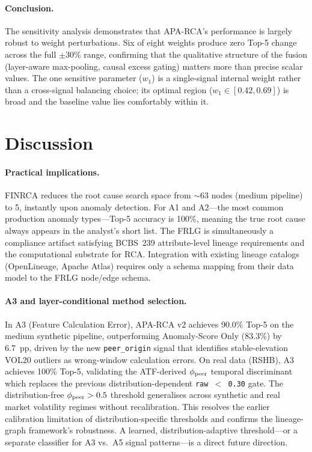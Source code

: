 \documentclass{article}
\newcommand{\finrca}{\textsc{FINRCA}}
\newcommand{\aparca}{\textsc{APA-RCA}}
\begin{document}
\paragraph{Conclusion.}
The sensitivity analysis demonstrates that \aparca{}'s performance is largely
robust to weight perturbations.
Six of eight weights produce zero Top-5 change across the full $\pm$30\% range,
confirming that the qualitative structure of the fusion (layer-aware max-pooling,
causal excess gating) matters more than precise scalar values.
The one sensitive parameter ($w_1$) is a single-signal internal weight
rather than a cross-signal balancing choice; its optimal region ($w_1 \in [0.42, 0.69]$)
is broad and the baseline value lies comfortably within it.

\section{Discussion}
\label{sec:discussion}

\paragraph{Practical implications.}
\finrca{} reduces the root cause search space from $\sim$63 nodes (medium
pipeline) to 5, instantly upon anomaly detection.
For A1 and A2---the most common production anomaly types---Top-5 accuracy is
100\%, meaning the true root cause always appears in the analyst's short list.
The FRLG is simultaneously a compliance artifact satisfying BCBS~239
attribute-level lineage requirements and the computational substrate for RCA.
Integration with existing lineage catalogs (OpenLineage, Apache Atlas) requires
only a schema mapping from their data model to the FRLG node/edge schema.

\paragraph{A3 and layer-conditional method selection.}
In A3 (Feature Calculation Error), \aparca{} v2 achieves 90.0\% Top-5 on the medium
synthetic pipeline, outperforming Anomaly-Score Only (83.3\%) by 6.7~pp,
driven by the new \texttt{peer\_origin} signal that identifies stable-elevation VOL20
outliers as wrong-window calculation errors.
On real data (RSHB), A3 achieves 100\% Top-5, validating the ATF-derived
$\phi_{\rm peer}$ temporal discriminant which replaces the previous
distribution-dependent \texttt{raw\,$<$\,0.30} gate.
The distribution-free $\phi_{\rm peer} > 0.5$ threshold generalises across
synthetic and real market volatility regimes without recalibration.
This resolves the earlier calibration limitation of distribution-specific thresholds
and confirms the lineage-graph framework's robustness.
A learned, distribution-adaptive threshold---or a separate classifier for
A3 vs.\ A5 signal patterns---is a direct future direction.
\end{document}

